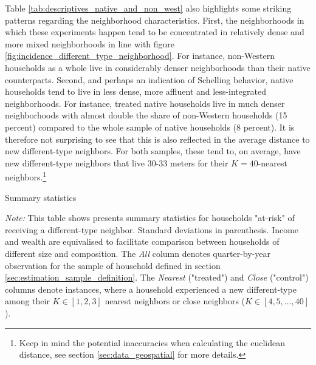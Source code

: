 \documentclass[main.tex]{subfiles}
\begin{document}
Table \ref{tab:descriptives_native_and_non_west} also highlights some striking patterns regarding the neighborhood characteristics. First, the neighborhoods in which these experiments happen tend to be concentrated in relatively dense and more mixed neighborhoods in line with figure \ref{fig:incidence_different_type_neighborhood}. For instance, non-Western households as a whole live in considerably denser neighborhoods than their native counterparts. Second, and perhaps an indication of Schelling behavior, native households tend to live in less dense, more affluent and less-integrated neighborhoods. For instance, treated native households live in much denser neighborhoods with almost double the share of non-Western households (15 percent) compared to the whole sample of native households (8 percent). It is therefore not surprising to see that this is also reflected in the average distance to new different-type neighbors. For both samples, these tend to, on average, have new different-type neighbors that live 30-33 meters for their $K=40$-nearest neighbors.\footnote{Keep in mind the potential inaccuracies when calculating the euclidean distance, see section \ref{sec:data_geospatial} for more details.}

\begin{landscape}

\begin{table}[H]
    \centering
    \caption{Summary statistics}
    \label{tab:descriptives_native_and_non_west}
    \begin{adjustbox}{width = 0.9\linewidth, center}
    \begin{threeparttable}
        
    
\begin{tablenotes}[flushleft]
\item \footnotesize \textit{Note:} This table shows presents summary statistics for households "at-risk" of receiving a different-type neighbor. Standard deviations in parenthesis. Income and wealth are equivalised to facilitate comparison between households of different size and composition. The \textit{All} column denotes quarter-by-year observation for the sample of household defined in section \ref{sec:estimation_sample_definition}. The \textit{Nearest} ("treated") and \textit{Close} ("control") columns denote instances, where a household experienced a new different-type among their $K\in [1,2,3]$ nearest neighbors or close neighbors ($K\in [4, 5, ...,40]$).
\end{tablenotes}

    \end{threeparttable}
    \end{adjustbox}
\end{table}
    
\end{landscape}
\end{document}
